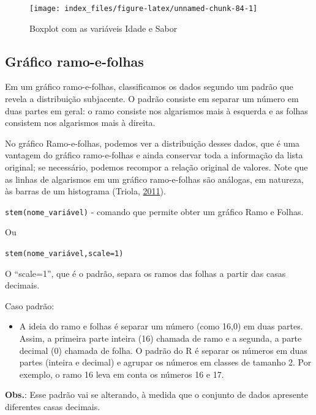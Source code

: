 \documentclass[12pt,brazil,oneside]{book}
\providecommand{\tightlist}{%
  \setlength{\itemsep}{0pt}\setlength{\parskip}{0pt}}
\begin{document}
\begin{figure}[H]

{\centering \texttt{[image: index\_files/figure-latex/unnamed-chunk-84-1]} 

}

\caption{Boxplot com as variáveis Idade e Sabor}\label{fig:unnamed-chunk-84}
\end{figure}

\hypertarget{grafico-ramo-e-folhas}{%
\subsection{Gráfico ramo-e-folhas}\label{grafico-ramo-e-folhas}}

Em um gráfico ramo-e-folhas, classificamos os dados segundo um padrão que revela a distribuição subjacente. O padrão consiste em separar um número em duas partes em geral: o ramo consiste nos algarismos mais à esquerda e as folhas consistem nos algarismos mais à direita.

No gráfico Ramo-e-folhas, podemos ver a distribuição desses dados, que é uma vantagem do gráfico ramo-e-folhas e ainda conservar toda a informação da lista original; se necessário, podemos recompor a relação original de valores. Note que as linhas de algarismos em um gráfico ramo-e-folhas são análogas, em natureza, às barras de um histograma (Triola, \protect\hyperlink{ref-triola1999}{2011}).

\texttt{stem(nome\_variável)} - comando que permite obter um gráfico Ramo e Folhas.

Ou

\texttt{stem(nome\_variável,scale=1)}

O ``scale=1'', que é o padrão, separa os ramos das folhas a partir das casas decimais.

Caso padrão:

\begin{itemize}
\tightlist
\item
  A ideia do ramo e folhas é separar um número (como 16,0) em duas partes. Assim, a primeira parte inteira (16) chamada de ramo e a segunda, a parte decimal (0) chamada de folha. O padrão do R é separar os números em duas partes (inteira e decimal) e agrupar os números em classes de tamanho 2. Por exemplo, o ramo 16 leva em conta os números 16 e 17.
\end{itemize}

\textbf{Obs.}: Esse padrão vai se alterando, à medida que o conjunto de dados apresente diferentes casas decimais.
\end{document}
